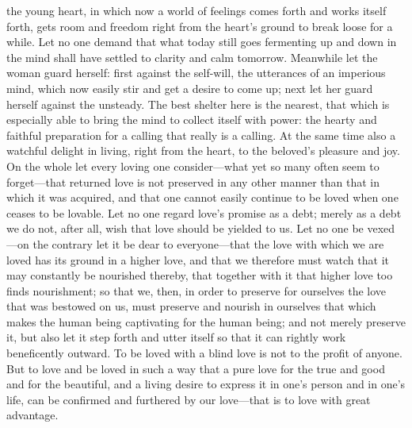 \documentclass[12pt,a4paper]{book}
\begin{document}
the young heart, in which now a world of feelings comes forth and works
itself forth, gets room and freedom right from the heart's ground to break
loose for a while. Let no one demand that what today still goes fermenting
up and down in the mind shall have settled to clarity and calm tomorrow.
Meanwhile let the woman guard herself: first against the self-will, the
utterances of an imperious mind, which now easily stir and get a desire to
come up; next let her guard herself against the unsteady. The best shelter
here is the nearest, that which is especially able to bring the mind to
collect itself with power: the hearty and faithful preparation for a
calling that really is a calling. At the same time also a watchful delight
in living, right from the heart, to the beloved's pleasure and joy. On the
whole let every loving one consider---what yet so many often seem to
forget---that returned love is not preserved in any other manner than that
in which it was acquired, and that one cannot easily continue to be loved
when one ceases to be lovable. Let no one regard love's promise as a debt;
merely as a debt we do not, after all, wish that love should be yielded to
us. Let no one be vexed---on the contrary let it be dear to everyone---that
the love with which we are loved has its ground in a higher love, and that
we therefore must watch that it may constantly be nourished thereby, that
together with it that higher love too finds nourishment; so that we, then,
in order to preserve for ourselves the love that was bestowed on us, must
preserve and nourish in ourselves that which makes the human being
captivating for the human being; and not merely preserve it, but also let
it step forth and utter itself so that it can rightly work beneficently
outward. To be loved with a blind love is not to the profit of anyone. But
to love and be loved in such a way that a pure love for the true and good
and for the beautiful, and a living desire to express it in one's person
and in one's life, can be confirmed and furthered by our love---that is to
love with great advantage.
\end{document}
